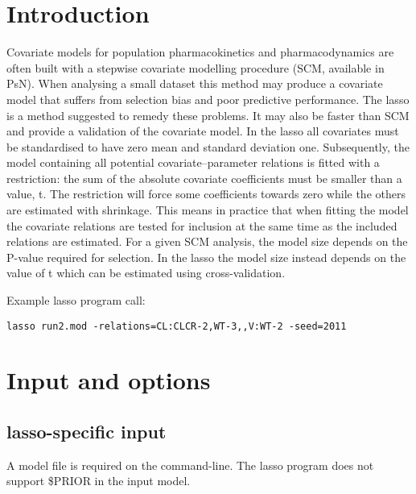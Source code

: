 




\maketitle
\newcommand{\guidetoolname}{lasso}


\section{Introduction}
Covariate models for population pharmacokinetics and pharmacodynamics are often built with a stepwise covariate modelling procedure (SCM, available in PsN). When analysing a small dataset this method may produce a covariate model that suffers from selection bias and poor predictive performance. The lasso \cite{Ribbing} is a method suggested to remedy these problems. It may also be faster than SCM and provide a validation of the covariate model. In the lasso all covariates must be standardised to have zero mean and standard deviation one. Subsequently, the model containing all potential covariate–parameter relations is fitted with a restriction: the sum of the absolute covariate coefficients must be smaller than a value, t. The restriction will force some coefficients towards zero while the others are estimated with shrinkage. This means in practice that when fitting the model the covariate relations are tested for inclusion at the same time as the included relations are estimated. For a given SCM analysis, the model size depends on the P-value required for selection. In the lasso the model size instead depends on the value of t which can be estimated using cross-validation.

Example lasso program call:
\begin{verbatim}
lasso run2.mod -relations=CL:CLCR-2,WT-3,,V:WT-2 -seed=2011
\end{verbatim}

\section{Input and options}

\subsection{lasso-specific input}
A model file is required on the command-line.
The lasso program does not support \$PRIOR in the input model.

